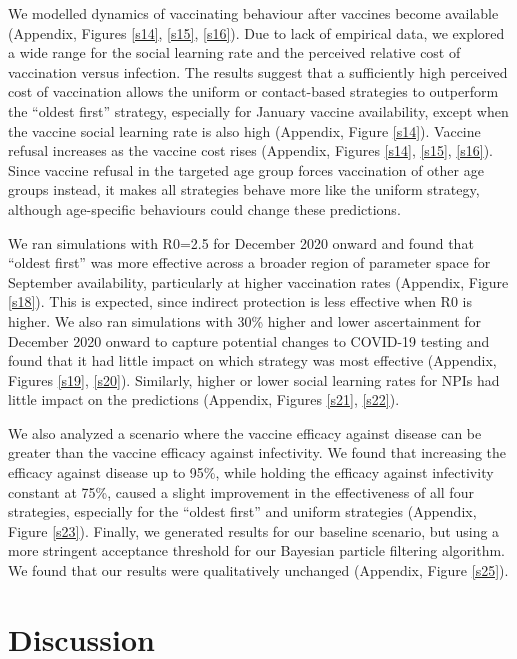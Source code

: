 We modelled dynamics of vaccinating behaviour after vaccines become available (Appendix, Figures \ref{s14}, \ref{s15}, \ref{s16}).  Due to lack of empirical data, we explored a wide range for the social learning rate and the perceived relative cost of vaccination versus infection. The results suggest that a sufficiently high perceived cost of vaccination allows the uniform or contact-based strategies to outperform the “oldest first” strategy, especially for January vaccine availability, except when the vaccine social learning rate is also high (Appendix, Figure \ref{s14}). Vaccine refusal increases as the vaccine cost rises (Appendix, Figures \ref{s14}, \ref{s15}, \ref{s16}). Since vaccine refusal in the targeted age group forces vaccination of other age groups instead, it makes all strategies behave more like the uniform strategy, although age-specific behaviours could change these predictions. 

We ran simulations with R0=2.5 for December 2020 onward and found that “oldest first” was more effective across a broader region of parameter space for September availability, particularly at higher vaccination rates (Appendix, Figure \ref{s18}). This is expected, since indirect protection is less effective when R0 is higher. We also ran simulations with 30\% higher and lower ascertainment for December 2020 onward to capture potential changes to COVID-19 testing and found that it had little impact on which strategy was most effective (Appendix, Figures \ref{s19}, \ref{s20}).  Similarly, higher or lower social learning rates for NPIs had little impact on the predictions (Appendix, Figures \ref{s21}, \ref{s22}). 

We also analyzed a scenario where the vaccine efficacy against disease can be greater than the vaccine efficacy against infectivity. We found that increasing the efficacy against disease up to 95\%, while holding the efficacy against infectivity constant at 75\%, caused a slight improvement in the effectiveness of all four strategies, especially for the “oldest first” and uniform strategies (Appendix, Figure \ref{s23}).  Finally, we generated results for our baseline scenario, but using a more stringent acceptance threshold for our Bayesian particle filtering algorithm. We found that our results were qualitatively unchanged (Appendix, Figure  \ref{s25}).  


\section{Discussion}

